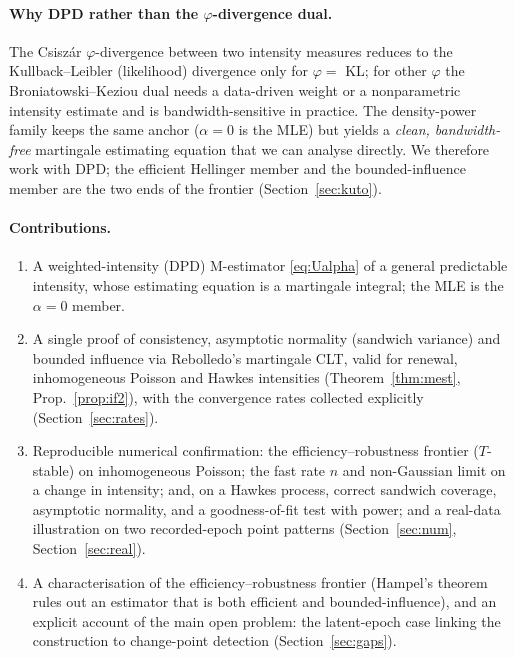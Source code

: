 \documentclass[11pt]{article}
\begin{document}
\paragraph{Why DPD rather than the $\varphi$-divergence dual.}
The Csiszár $\varphi$-divergence between two intensity measures reduces to the
Kullback--Leibler (likelihood) divergence only for $\varphi=$ KL; for other
$\varphi$ the Broniatowski--Keziou dual needs a data-driven weight or a
nonparametric intensity estimate and is bandwidth-sensitive in practice. The
density-power family keeps the same anchor ($\alpha=0$ is the MLE) but yields a
\emph{clean, bandwidth-free} martingale estimating equation that we can analyse
directly. We therefore work with DPD; the efficient Hellinger member and the
bounded-influence member are the two ends of the frontier (Section~\ref{sec:kuto}).

\paragraph{Contributions.}
\begin{enumerate}
\item A weighted-intensity (DPD) M-estimator \eqref{eq:Ualpha} of a general
predictable intensity, whose estimating equation is a martingale integral; the MLE
is the $\alpha=0$ member.
\item A single proof of consistency, asymptotic normality (sandwich variance) and
bounded influence via Rebolledo's martingale CLT, valid for renewal, inhomogeneous
Poisson and Hawkes intensities (Theorem~\ref{thm:mest}, Prop.~\ref{prop:if2}),
with the convergence rates collected explicitly (Section~\ref{sec:rates}).
\item Reproducible numerical confirmation: the efficiency--robustness frontier
($T$-stable) on inhomogeneous Poisson; the fast rate $n$ and non-Gaussian limit on
a change in intensity; and, on a Hawkes process, correct sandwich coverage,
asymptotic normality, and a goodness-of-fit test with power; and a real-data
illustration on two recorded-epoch point patterns (Section~\ref{sec:num},
Section~\ref{sec:real}).
\item A characterisation of the efficiency--robustness frontier (Hampel's theorem
rules out an estimator that is both efficient and bounded-influence), and an
explicit account of the main open problem: the latent-epoch case linking the
construction to change-point detection (Section~\ref{sec:gaps}).
\end{enumerate}
\end{document}
